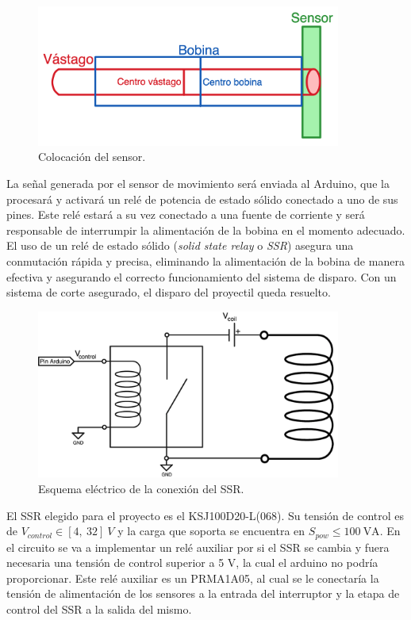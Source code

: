 \begin{figure}[H]
    \centering
    \includegraphics[width=10cm]{FigurasMemoria/esquemaJustDisparo.png}
    \caption{Colocación del sensor.}
    \label{fig:esquemaJustDisparo} %
\end{figure}

La señal generada por el sensor de movimiento será enviada al Arduino, que la procesará y activará un relé de potencia de estado sólido conectado a uno de sus pines. Este relé estará a su vez conectado a una fuente de corriente y será responsable de interrumpir la alimentación de la bobina en el momento adecuado. El uso de un relé de estado sólido (\textit{solid state relay} o \textit{SSR}) asegura una conmutación rápida y precisa, eliminando la alimentación de la bobina de manera efectiva y asegurando el correcto funcionamiento del sistema de disparo. Con un sistema de corte asegurado, el disparo del proyectil queda resuelto.

\begin{figure}[H]
    \centering
    \includegraphics[width=10cm]{FigurasMemoria/conexionRele.png}
    \caption{Esquema eléctrico de la conexión del SSR.}
    \label{fig:conexionRele} %
\end{figure}

El SSR elegido para el proyecto es el KSJ100D20-L(068). Su tensión de control es de \(V_{control}\in [4,~32]~V\) y la carga que soporta se encuentra en \(S_{pow}\leq 100~\text{VA}\). En el circuito se va a implementar un relé auxiliar por si el SSR se cambia y fuera necesaria una tensión de control superior a 5 V, la cual el arduino no podría proporcionar. Este relé auxiliar es un PRMA1A05, al cual se le conectaría la tensión de alimentación de los sensores a la entrada del interruptor y la etapa de control del SSR a la salida del mismo.


